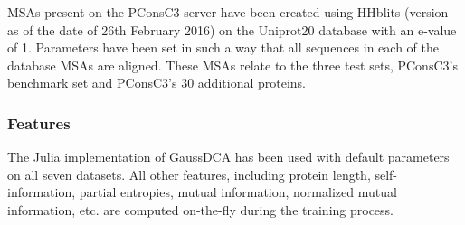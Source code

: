         MSAs present on the PConsC3 server
        have been created using HHblits
        (version as of the date of 26th February 2016) on the Uniprot20 database
        with an e-value of 1. Parameters have been set in such a way that all
        sequences in each of the database MSAs are aligned.
        These MSAs relate to the three test sets, PConsC3's benchmark set and
        PConsC3's 30 additional proteins.

    \subsubsection{Features}

        The Julia implementation of GaussDCA has been used with default parameters
        on all seven datasets. All other features, including protein length, self-information,
        partial entropies, mutual information, normalized mutual information, etc.
        are computed on-the-fly during the training process.
